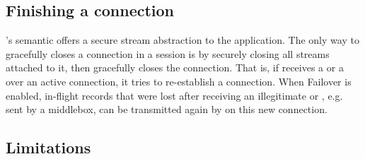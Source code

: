 \subsection{Finishing a \tcpls connection}
\tcpls's semantic offers a secure stream abstraction to the application.
The only way to gracefully closes a \tcp connection in a \tcpls session
is by securely closing all streams attached to it, then \tcpls gracefully closes the
\tcp connection. That is, if \tcpls receives a \rst or a \fin over an active
\tcp connection, it tries to re-establish a \tcp connection. 
When Failover is enabled, in-flight records that were lost after receiving 
an illegitimate \rst or \fin, e.g. sent by a middlebox, can be transmitted again by \tcpls
on this new \tcp connection.

\subsection{Limitations}


